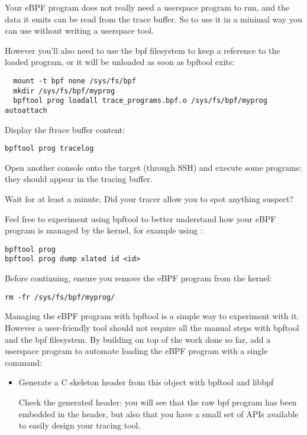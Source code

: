 Your eBPF program does not really need a userspace program to run, and the
data it emits can be read from the trace buffer. So to use it in a minimal
way you can use  without writing a userspace tool.

However you'll also need to use the bpf filesystem to keep a reference to
the loaded program, or it will be unloaded as soon as bpftool exits:

\begin{verbatim}
  mount -t bpf none /sys/fs/bpf
  mkdir /sys/fs/bpf/myprog
  bpftool prog loadall trace_programs.bpf.o /sys/fs/bpf/myprog autoattach
\end{verbatim}

Display the ftrace buffer content:

\begin{verbatim}
bpftool prog tracelog
\end{verbatim}

Open another console onto the target (through SSH) and execute some
programs: they should appear in the tracing buffer.

Wait for at least a minute. Did your tracer allow you to spot anything
suspect?

Feel free to experiment using bpftool to better understand how your eBPF
program is managed by the kernel, for example using :

\begin{verbatim}
bpftool prog
bpftool prog dump xlated id <id>
\end{verbatim}

Before continuing, ensure you remove the eBPF program from the kernel:

\begin{verbatim}
rm -fr /sys/fs/bpf/myprog/
\end{verbatim}

Managing the eBPF program with bpftool is a simple way to experiment with
it. However a user-friendly tool should not require all the manual steps
with bpftool and the bpf filesystem. By building on top of the work done so
far, add a userspace program to automate loading the eBPF program with a
single command:

\begin{itemize}
  \item Generate a C skeleton header from this object with bpftool and libbpf
  Check the generated header: you will see that the raw bpf program has been
  embedded in the header, but also that you have a small set of APIs available
  to easily design your tracing tool.
\end{itemize}

